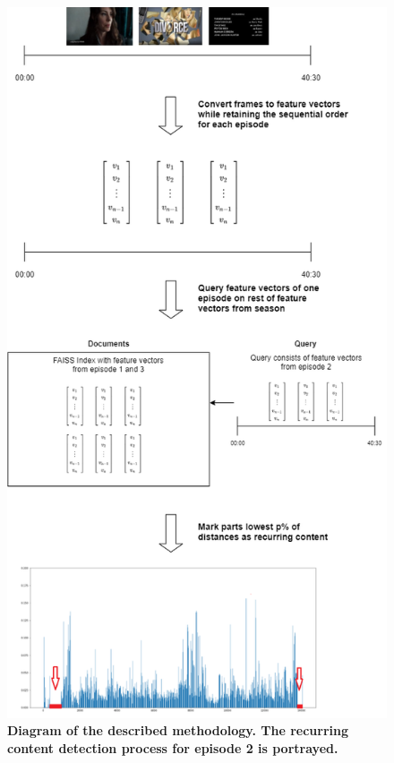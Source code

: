 \documentclass{report}
\begin{document}
\begin{figure}[H]
	\includegraphics[width=\textwidth, center, scale=0.75]{images/thesisdiagram.png}
	\centering
	\caption{\textbf{Diagram of the described methodology. The recurring content detection process for episode 2 is portrayed.}}
	\label{fig:diagram}
\end{figure}
\end{document}
